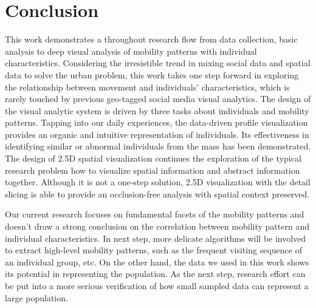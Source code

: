 \section{Conclusion}
\label{sec:conclusion}

This work demonstrates a throughout research flow from data collection, basic analysis to deep visual analysis of mobility patterns with individual characteristics. Considering the irresistible trend in mixing social data and spatial data to solve the urban problem, this work takes one step forward in exploring the relationship between movement and individuals' characteristics, which is rarely touched by previous geo-tagged social media visual analytics. The design of the visual analytic system is driven by three tasks about individuals and mobility patterns. Tapping into our daily experiences, the data-driven profile visualization provides an organic and intuitive representation of individuals. Its effectiveness in identifying similar or abnormal individuals from the mass has been demonstrated. The design of 2.5D spatial visualization continues the exploration of the typical research problem how to visualize spatial information and abstract information together. Although it is not a one-step solution, 2.5D visualization with the detail slicing is able to provide an occlusion-free analysis with spatial context preserved.

Our current research focuses on fundamental facets of the mobility patterns and doesn't draw a strong conclusion on the correlation between mobility pattern and individual characteristics. In next step, more delicate algorithms will be involved to extract high-level mobility patterns, such as the frequent visiting sequence of an individual group, etc. On the other hand, the data we used in this work shows its potential in representing the population. As the next step, research effort can be put into a more serious verification of how small sampled data can represent a large population.



%




